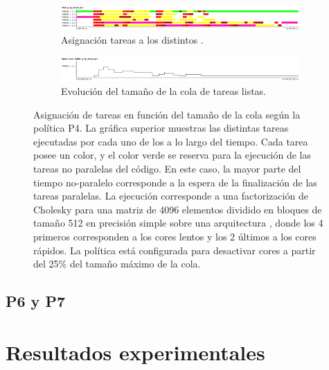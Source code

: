 \begin{figure}
  \centering
  \begin{framed}
    \begin{subfigure}{.9\textwidth}
      \centering
      \includegraphics[width=1\linewidth]{Figures/Politicas_evo/Apagado_tareas.png}
      \caption{Asignación tareas a los distintos \wts.}
      \label{}
    \end{subfigure}

    \begin{subfigure}{0.9\textwidth}
      \centering
      \includegraphics[width=1\linewidth]{Figures/Politicas_evo/Apagado_colas.png}
      \caption{Evolución del tamaño de la cola de tareas listas.}
      \label{}
    \end{subfigure}  
    
  \end{framed}
    \caption[Asignación de tareas en función del tamaño de la cola según la
    política P4]{Asignación de tareas en función del tamaño de la cola
      según la política P4. La gráfica superior muestras las distintas
      tareas ejecutadas por cada uno de los \wts a lo largo del
      tiempo. Cada tarea posee un color, y el color verde se reserva para
      la ejecución de las tareas no paralelas del código. En este caso, la
      mayor parte del tiempo no-paralelo corresponde a la espera de la
      finalización de las tareas paralelas. La ejecución corresponde a una
      factorización de Cholesky para una matriz de 4096 elementos dividido
      en bloques de tamaño 512 en precisión simple sobre una arquitectura
      \juno, donde los 4 primeros \wts corresponden a los cores lentos y
      los 2 últimos a los cores rápidos. La política está configurada para
      desactivar cores a partir del 25\% del tamaño máximo de la cola.}
  \label{fig:P4-evo}
\end{figure}



\subsection{P6 y P7}


\section{Resultados experimentales}




